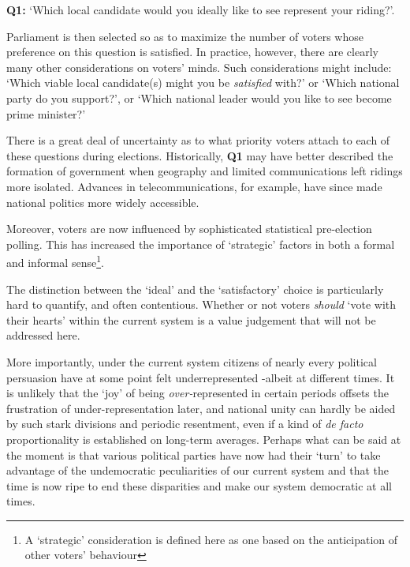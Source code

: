 \documentclass[DIV=calc, paper=a4, fontsize=11pt, twocolumn]{scrartcl}	 %
\begin{document}
\begin{tcolorbox}[colback=white!5!white,colframe=blue!55!black]
{\textbf{Q1:} } `Which local candidate would you ideally like to see represent your riding?'. 
\end{tcolorbox}

Parliament is then selected so as to maximize the number of voters whose preference on this question is satisfied.
In practice, however, there are clearly many other considerations on voters' minds. 
Such considerations might include: `Which viable local candidate(s) might you be \emph{satisfied} with?'  or `Which national party do you support?', or `Which national leader would you like to see become prime minister?' 

There is a great deal of uncertainty as to what priority voters attach to each of these questions during elections. Historically, \textbf{Q1} may have better described the formation of government when geography and limited communications left ridings more isolated.
Advances in telecommunications, for example, have since made national politics more widely accessible. 

Moreover, voters are now influenced by sophisticated statistical pre-election polling. This has increased the importance of `strategic' factors in both a formal\cite{Leadnow_environics} and informal sense\footnote{A `strategic'  consideration is defined here as one based on the anticipation of other voters' behaviour}. 

The distinction between the `ideal' and the `satisfactory' choice is particularly hard to quantify, and often contentious.
Whether or not voters \emph{should} `vote with their hearts' within the current system is a value judgement that will not be addressed here. 


More importantly, under the current system citizens of nearly every political persuasion have at some point felt underrepresented \--albeit at different times. It is unlikely that the `joy' of being \emph{over-}represented in certain periods offsets the frustration of under-representation later, and
 national unity can hardly be aided by such stark divisions and periodic resentment, even if a kind of \emph{ de facto} proportionality is established on long-term averages. 
Perhaps what can be said at the moment is that various political parties have now had their `turn' to take advantage of the undemocratic peculiarities of our current system and that the time is now ripe to end these disparities and make our system democratic at all times. 
\end{document}
